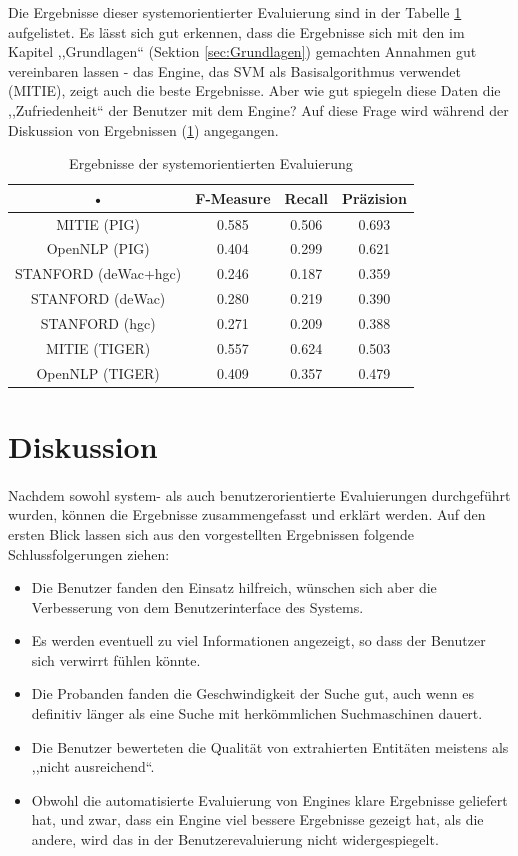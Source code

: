 Die Ergebnisse dieser systemorientierter Evaluierung sind in der Tabelle \ref{tab:AUTOEVAL} aufgelistet. Es lässt sich gut erkennen, dass die Ergebnisse sich mit den im Kapitel ,,Grundlagen`` (Sektion \ref{sec:Grundlagen}) gemachten Annahmen gut vereinbaren lassen - das Engine, das SVM als Basisalgorithmus verwendet (MITIE), zeigt auch die beste Ergebnisse. Aber wie gut spiegeln diese Daten die ,,Zufriedenheit`` der Benutzer mit dem Engine? Auf diese Frage wird während der Diskussion von Ergebnissen (\ref{sec:diskussion}) angegangen.

\begin{table}
\begin{tabular}{|c|c|c|c|}
\hline 
• & F-Measure & Recall & Präzision \\ 
\hline 
MITIE (PIG) & 0.585 & 0.506 & 0.693 \\
\hline
OpenNLP (PIG) & 0.404 & 0.299 & 0.621 \\
\hline
STANFORD (deWac+hgc) & 0.246 & 0.187 & 0.359 \\
\hline
STANFORD (deWac) & 0.280 & 0.219 & 0.390 \\
\hline
STANFORD (hgc) & 0.271 & 0.209 & 0.388 \\
\hline 
MITIE (TIGER) & 0.557 & 0.624 & 0.503 \\
\hline
OpenNLP (TIGER) & 0.409 & 0.357 & 0.479 \\
\hline
\end{tabular} 
\caption{Ergebnisse der systemorientierten Evaluierung}
\label{tab:AUTOEVAL}
\end{table}

\section{Diskussion} \label{sec:diskussion}
\paragraph{}
Nachdem sowohl system- als auch benutzerorientierte Evaluierungen durchgeführt wurden, können die Ergebnisse zusammengefasst und erklärt werden. Auf den ersten Blick lassen sich aus den vorgestellten Ergebnissen folgende Schlussfolgerungen ziehen:
\begin{itemize}
\item Die Benutzer fanden den Einsatz hilfreich, wünschen sich aber die Verbesserung von dem Benutzerinterface des Systems.
\item Es werden eventuell zu viel Informationen angezeigt, so dass der Benutzer sich verwirrt fühlen könnte.
\item Die Probanden fanden die Geschwindigkeit der Suche gut, auch wenn es definitiv länger als eine Suche mit herkömmlichen Suchmaschinen dauert. 
\item Die Benutzer bewerteten die Qualität von extrahierten Entitäten meistens als ,,nicht ausreichend``.
\item Obwohl die automatisierte Evaluierung von Engines klare Ergebnisse geliefert hat, und zwar, dass ein Engine viel bessere Ergebnisse gezeigt hat, als die andere, wird das in der Benutzerevaluierung nicht widergespiegelt.
\end{itemize}

